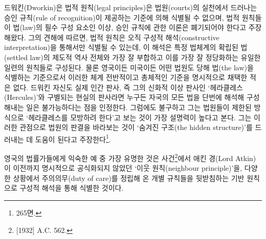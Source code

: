 드워킨(Dworkin)은 법적 원칙(legal principles)은 법원(courts)의 실천에서
드러나는 승인 규칙(rule of recognition)이 제공하는 기준에 의해 식별될 수
없으며, 법적 원칙들이 법(law)의 필수 구성 요소인 이상, 승인 규칙에 관한
이론은 폐기되어야 한다고 주장해왔다. 그의 견해에 따르면, 법적 원칙은
오직 구성적 해석(constructive interpretation)을 통해서만 식별될 수
있는데, 이 해석은 특정 법체계의 확립된 법(settled law)의 제도적 역사
전체와 가장 잘 부합하고 이를 가장 잘 정당화하는 유일한 일련의 원칙들로
구성된다. 물론 영국이든 미국이든 어떤 법원도 당해 법(the law)을 식별하는
기준으로서 이러한 체계 전반적이고 총체적인 기준을 명시적으로 채택한 적은
없다. 드워킨 자신도 실제 인간 판사, 즉 그의 신화적 이상 판사인
`헤라클레스(Hercules)'와 구별되는 현실의 판사라면 누구든 자국의 모든
법을 단번에 해석해 구성해내는 일은 불가능하다는 점을 인정한다. 그럼에도
불구하고 그는 법원들이 제한된 방식으로 `헤라클레스를 모방하려 한다'고
보는 것이 가장 설명력이 높다고 본다. 그는 이러한 관점으로 법원의 판결을
바라보는 것이 `숨겨진 구조(the hidden structure)'를 드러내는 데 도움이
된다고 주장한다\footnote{ 265면.}.

영국의 법률가들에게 익숙한 예 중 가장 유명한 것은  사건\footnote{{[}1932{]} A.C. 562.}에서 애킨 경(Lord Atkin)이
이전까지 명시적으로 공식화되지 않았던 `이웃 원칙(neighbour
principle)'을, 다양한 상황에서 주의의무(duty of care)를 정립해 온 개별
규칙들을 뒷받침하는 기반 원칙으로 구성적 해석을 통해 식별한 것이다.

